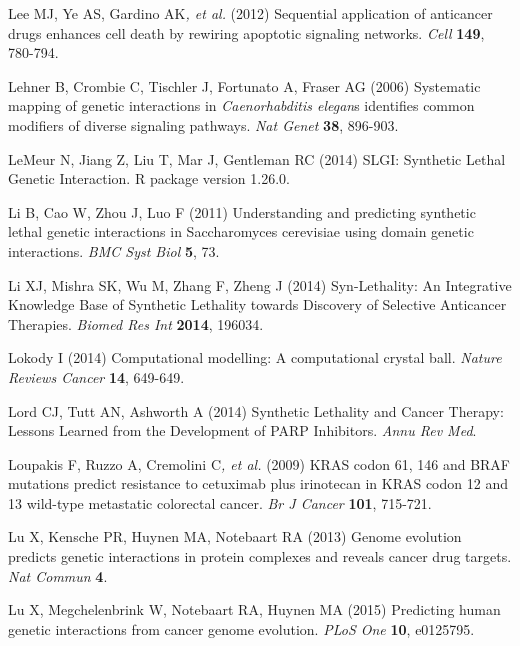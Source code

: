Lee MJ, Ye AS, Gardino AK\textit{, et al.} (2012) Sequential application
of anticancer drugs enhances cell death by rewiring apoptotic signaling
networks. \textit{Cell} \textbf{149}, 780-794.



Lehner B, Crombie C, Tischler J, Fortunato A, Fraser AG (2006)
Systematic mapping of genetic interactions in \textit{Caenorhabditis
elegan}s identifies common modifiers of diverse signaling pathways.
\textit{Nat Genet} \textbf{38}, 896-903.



\hypertarget{ENREF67}{}LeMeur N, Jiang Z, Liu T, Mar J, Gentleman RC
(2014) SLGI: Synthetic Lethal Genetic Interaction. R package version
1.26.0.



\hypertarget{ENREF68}{}Li B, Cao W, Zhou J, Luo F (2011) Understanding
and predicting synthetic lethal genetic interactions in Saccharomyces
cerevisiae using domain genetic interactions. \textit{BMC Syst Biol}
\textbf{5}, 73.



\hypertarget{ENREF69}{}Li XJ, Mishra SK, Wu M, Zhang F, Zheng J (2014)
Syn-Lethality: An Integrative Knowledge Base of Synthetic Lethality
towards Discovery of Selective Anticancer Therapies. \textit{Biomed Res
Int} \textbf{2014}, 196034.



\hypertarget{ENREF70}{}Lokody I (2014) Computational modelling: A
computational crystal ball. \textit{Nature Reviews Cancer} \textbf{14},
649-649.



Lord CJ, Tutt AN, Ashworth A (2014) Synthetic Lethality and Cancer
Therapy: Lessons Learned from the Development of PARP Inhibitors.
\textit{Annu Rev Med}.



Loupakis F, Ruzzo A, Cremolini C\textit{, et al.} (2009) KRAS codon 61,
146 and BRAF mutations predict resistance to cetuximab plus irinotecan
in KRAS codon 12 and 13 wild-type metastatic colorectal cancer.
\textit{Br J Cancer} \textbf{101}, 715-721.



\hypertarget{ENREF73}{}Lu X, Kensche PR, Huynen MA, Notebaart RA (2013)
Genome evolution predicts genetic interactions in protein complexes and
reveals cancer drug targets. \textit{Nat Commun} \textbf{4}.



\hypertarget{ENREF74}{}Lu X, Megchelenbrink W, Notebaart RA, Huynen MA
(2015) Predicting human genetic interactions from cancer genome
evolution. \textit{PLoS One} \textbf{10}, e0125795.



